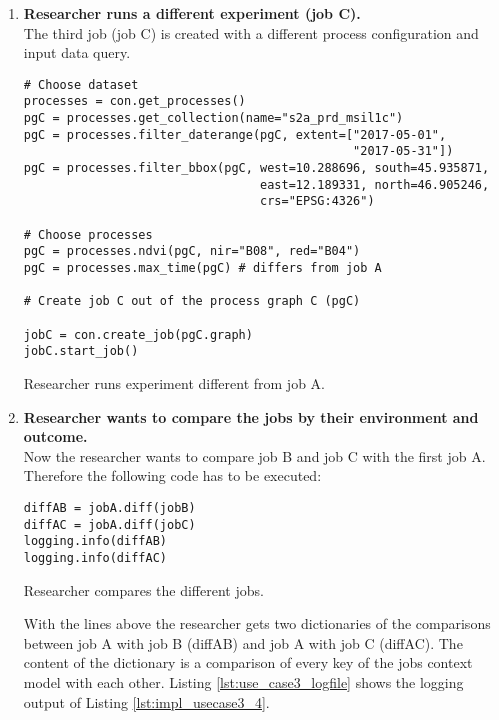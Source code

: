 \documentclass[draft,final]{vutinfth} %
\newenvironment{code}{\captionsetup{type=listing}}{}
\begin{document}
\begin{enumerate}
	\item \textbf{Researcher runs a different experiment (job C).}\\
	The third job (job C) is created with a different process configuration and input data query.

\begin{code}
	\begin{verbatim}
# Choose dataset
processes = con.get_processes()
pgC = processes.get_collection(name="s2a_prd_msil1c")
pgC = processes.filter_daterange(pgC, extent=["2017-05-01", 
                                              "2017-05-31"])
pgC = processes.filter_bbox(pgC, west=10.288696, south=45.935871, 
                                 east=12.189331, north=46.905246, 
                                 crs="EPSG:4326")
	
# Choose processes
pgC = processes.ndvi(pgC, nir="B08", red="B04")
pgC = processes.max_time(pgC) # differs from job A
	
# Create job C out of the process graph C (pgC)
	
jobC = con.create_job(pgC.graph)
jobC.start_job()
	\end{verbatim}
	\caption{Researcher runs experiment different from job A.}
	\label{lst:impl_usecase3_3}
	
\end{code}

	\item \textbf{Researcher wants to compare the jobs by their environment and outcome.}\\
	Now the researcher wants to compare job B and job C with the first job A. Therefore the following code has to be executed:
	
	\begin{code}
		\begin{verbatim}
diffAB = jobA.diff(jobB)
diffAC = jobA.diff(jobC)
logging.info(diffAB)
logging.info(diffAC)
		\end{verbatim}
		\caption{Researcher compares the different jobs.}
		\label{lst:impl_usecase3_4}
		
	\end{code}
	 
	With the lines above the researcher gets two dictionaries of the comparisons between job A with job B (diffAB) and job A with job C (diffAC). The content of the dictionary is a comparison of every key of the jobs context model with each other. Listing \ref{lst:use_case3_logfile} shows the logging output of Listing \ref{lst:impl_usecase3_4}.
\end{enumerate}
\end{document}
